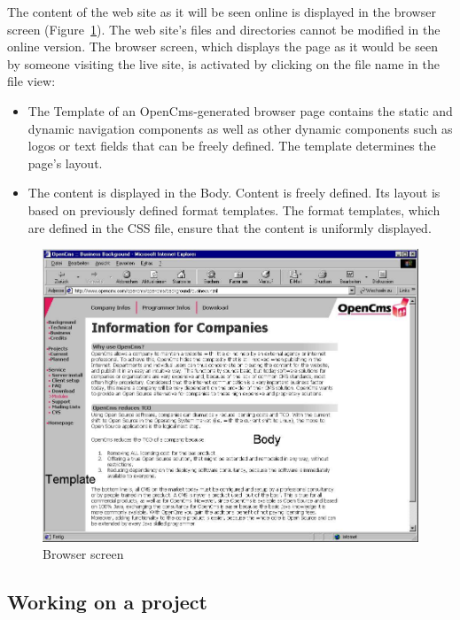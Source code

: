 The content of the web site as it will be seen online is displayed
in the browser screen (Figure~\ref{browserscreen}). The web site's
files and directories cannot be modified in the online version.
The browser screen, which displays the page as it would be seen by
someone visiting the live site, is activated by clicking on the
file name in the file view:

\begin{itemize}
\item The Template of an OpenCms-generated browser page contains the
static and dynamic navigation components as well as other dynamic
components such as logos or text fields that can be freely
defined. The template determines the page's layout.
\item The content is displayed in the Body. Content is freely defined. Its
layout is based on previously defined format templates. The format
templates, which are defined in the CSS file, ensure that the
content is uniformly displayed.
\end{itemize}

\begin{figure}[hbt]
\begin{center}
\includegraphics[width=\sgw]
                   {pics/usermanual/browserScreen}
\caption[Browser screen]
           {Browser screen}
\label{browserscreen}
\end{center}
\end{figure}

\subsection{Working on a project}

